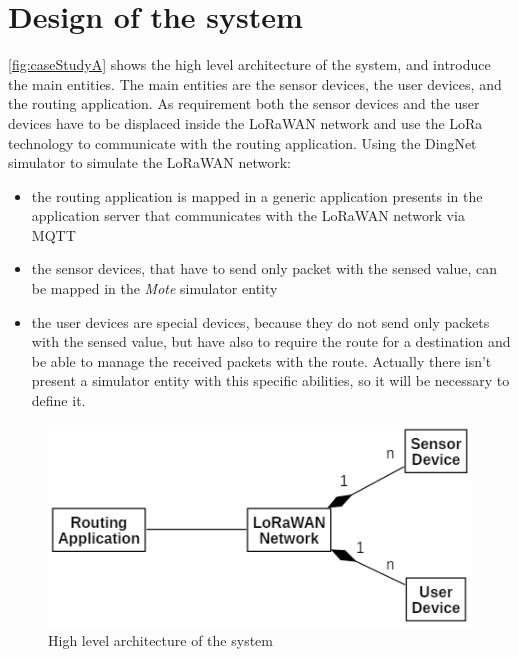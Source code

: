 \section{Design of the system}
\autoref{fig:caseStudyA} shows the high level architecture of the system, and introduce the main entities. 
The main entities are the sensor devices, the user devices, and the routing application.
As requirement both the sensor devices and the user devices have to be displaced inside the LoRaWAN network and use the LoRa technology to communicate with the routing application.
Using the DingNet simulator to simulate the LoRaWAN network:
\begin{itemize}
    \item the routing application is mapped in a generic application presents in the application server that communicates with the LoRaWAN network via MQTT
    \item the sensor devices, that have to send only packet with the sensed value, can be mapped in the \textit{Mote} simulator entity
    \item the user devices are special devices, because they do not send only packets with the sensed value, but have also to require the route for a destination and be able to manage the received packets with the route. Actually there isn't present a simulator entity with this specific abilities, so it will be necessary to define it.
\end{itemize}
% 
\begin{figure}[h]
    \centering
    \includegraphics{figures/CaseStudyA_HLarch.png}
    \caption{High level architecture of the system}
    \label{fig:caseStudyA}
\end{figure}
% 
